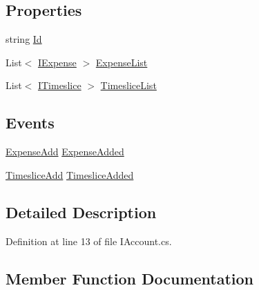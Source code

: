 \subsection*{Properties}
\begin{DoxyCompactItemize}
\item 
string \hyperlink{interface_plex_byte_1_1_mo_cap_1_1_interactions_1_1_i_account_a5f3422d283ccd4a4913fcba8863fe675}{Id}
\item 
List$<$ \hyperlink{interface_plex_byte_1_1_mo_cap_1_1_interactions_1_1_i_expense}{I\+Expense} $>$ \hyperlink{interface_plex_byte_1_1_mo_cap_1_1_interactions_1_1_i_account_ab720da432a5eaf3f694b7914569dd8c7}{Expense\+List}
\item 
List$<$ \hyperlink{interface_plex_byte_1_1_mo_cap_1_1_interactions_1_1_i_timeslice}{I\+Timeslice} $>$ \hyperlink{interface_plex_byte_1_1_mo_cap_1_1_interactions_1_1_i_account_a34e6de5df73fd44aa61cfd2492660ed0}{Timeslice\+List}
\end{DoxyCompactItemize}
\subsection*{Events}
\begin{DoxyCompactItemize}
\item 
\hyperlink{namespace_plex_byte_1_1_mo_cap_1_1_interactions_a7c03c08c6f524b34193985c455985f1f}{Expense\+Add} \hyperlink{interface_plex_byte_1_1_mo_cap_1_1_interactions_1_1_i_account_a47d037273f3fb8a3a17581b2c243226a}{Expense\+Added}
\item 
\hyperlink{namespace_plex_byte_1_1_mo_cap_1_1_interactions_a600557b92ababd90f6a91c524998565a}{Timeslice\+Add} \hyperlink{interface_plex_byte_1_1_mo_cap_1_1_interactions_1_1_i_account_a7866018e22c1935e5042e418360f855f}{Timeslice\+Added}
\end{DoxyCompactItemize}


\subsection{Detailed Description}


Definition at line 13 of file I\+Account.\+cs.



\subsection{Member Function Documentation}
